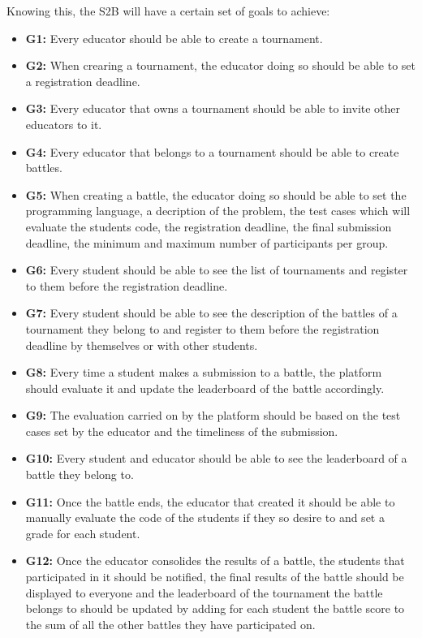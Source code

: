 \documentclass{article}
\begin{document}
Knowing this, the S2B will have a certain set of goals to achieve:
\begin{itemize}
    \item \textbf{G1:} Every educator should be able to create a tournament.
    \item \textbf{G2:} When crearing a tournament, the educator doing so should be able to set a registration deadline.
    \item \textbf{G3:} Every educator that owns a tournament should be able to invite other educators to it.
    \item \textbf{G4:} Every educator that belongs to a tournament should be able to create battles.
    \item \textbf{G5:} When creating a battle, the educator doing so should be able to set the programming language, a decription of the problem, the test cases which will evaluate the students code, the registration deadline, the final submission deadline, the minimum and maximum number of participants per group.
    \item \textbf{G6:} Every student should be able to see the list of tournaments and register to them before the registration deadline.
    \item \textbf{G7:} Every student should be able to see the description of the battles of a tournament they belong to and register to them before the registration deadline by themselves or with other students.
    \item \textbf{G8:} Every time a student makes a submission to a battle, the platform should evaluate it and update the leaderboard of the battle accordingly.
    \item \textbf{G9:} The evaluation carried on by the platform should be based on the test cases set by the educator and the timeliness of the submission.
    \item \textbf{G10:} Every student and educator should be able to see the leaderboard of a battle they belong to.
    \item \textbf{G11:} Once the battle ends, the educator that created it should be able to manually evaluate the code of the students if they so desire to and set a grade for each student.
    \item \textbf{G12:} Once the educator consolides the results of a battle, the students that participated in it should be notified, the final results of the battle should be displayed to everyone and the leaderboard of the tournament the battle belongs to should be updated by adding for each student the battle score to the sum of all the other battles they have participated on.

\end{itemize}
\end{document}
